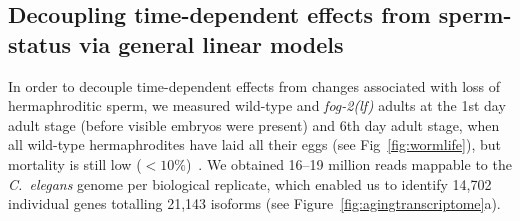 \documentclass[9pt,twocolumn,twoside]{gsag3jnl}
\newcommand{\cel}{\emph{C.~elegans}}
\newcommand{\fog}{\emph{\mbox{fog-2(lf)}}}
\begin{document}
\subsection*{Decoupling time-dependent effects from sperm-status via general
linear models}
\label{sub:Transcriptomics}
In order to decouple time-dependent effects from changes associated with loss of
hermaphroditic sperm, we measured wild-type and \fog{} adults at the 1st day
adult stage (before visible embryos were present) and 6th day adult stage, when
all wild-type hermaphrodites have laid all their eggs (see
Fig~\ref{fig:wormlife}), but mortality is still low
($<10\%$)~\citep{Stroustrup2013}.  We obtained 16--19 million reads mappable to
the \cel{} genome per biological replicate, which enabled us to identify 14,702
individual genes totalling 21,143 isoforms (see
Figure~\ref{fig:agingtranscriptome}a).
\end{document}
